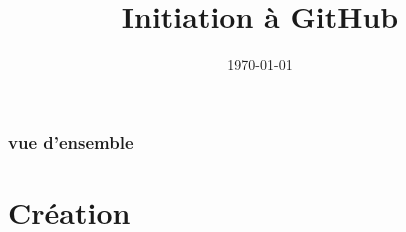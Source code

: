 \documentclass{beamer}
\title[Initiation GitHub]{Initiation \`{a} GitHub} %
\author{} %
\institute[Universit\'{e} de Rouen] %
{
Universit\'{e} de Rouen \\ %
\medskip
\textit{} %
}
\date{\today} %
\begin{document}
\begin{frame}
\titlepage %
\end{frame}

\begin{frame}
\frametitle{vue d'ensemble} %
\tableofcontents %
\end{frame}


\section{Cr\'eation} %
\end{document}
